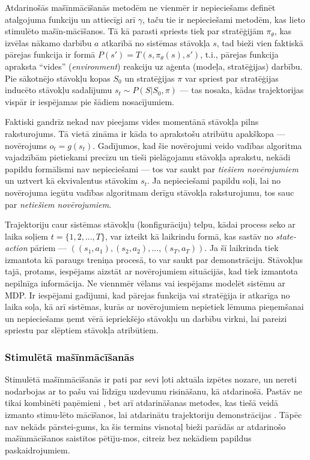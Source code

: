\documentclass[12pt, a4paper]{article}
\numberwithin{equation}{section} %
\begin{document}
Atdarinošās mašīnmācīšanās metodēm ne vienmēr ir nepieciešams definēt atalgojuma funkciju un attiecīgi arī $\gamma$, taču tie ir nepieciešami metodēm, kas lieto stimulēto mašīn-mācīšanos. Tā kā parasti spriests tiek par stratēģijām $\pi_{\theta}$, kas izvēlas nākamo darbību $a$ atkarībā no sistēmas stāvokļa $s$, tad bieži vien faktiskā pārejas funkcija ir formā $P(s') = T(s, \pi_{\theta}(s), s')$, t.i., pārejas funkcija apraksta ``vides'' (\textit{environment}) reakciju uz aģenta (modeļa, stratēģijas) darbību. Pie sākotnējo stāvokļu kopas $S_0$ un stratēģijas $\pi$ var spriest par stratēģijas inducēto stāvokļu sadalījumu $s_t \sim P(S \vert S_0, \pi)$ --- tas nosaka, kādas trajektorijas vispār ir iespējamas pie šādiem nosacījumiem. 

Faktiski gandrīz nekad nav pieejams vides momentānā stāvokļa pilns raksturojums. Tā vietā zināma ir kāda to aprakstošu atribūtu apakškopa --- novērojums $o_t = g(s_t)$. Gadījumos, kad šie novērojumi veido vadības algoritma vajadzībām pietiekami precīzu un tieši pielāgojamu stāvokļa aprakstu, nekādi papildu formālismi nav nepieciešami --- tos var saukt par \textit{tiešiem novērojumiem} un uztvert kā ekvivalentus stāvokim $s_t$. Ja nepieciešami papildu soļi, lai no novērojuma iegūtu vadības algoritmam derīgu stāvokļa raksturojumu, tos sauc par \textit{netiešiem novērojumiem}.

Trajektoriju caur sistēmas stāvokļu (konfigurāciju) telpu, kādai process seko ar laika soļiem $t = \lbrace 1, 2, ..., T \rbrace$, var izteikt kā laikrindu formā, kas sastāv no \textit{state-action} pāriem --- $((s_1, a_1), (s_2, a_2), ..., (s_T, a_T))$. Ja šī laikrinda tiek izmantota kā paraugs treniņa procesā, to var saukt par demonstrāciju. Stāvokļus tajā, protams, iespējams aizstāt ar novērojumiem situācijās, kad tiek izmantota nepilnīga informācija. Ne viennmēr vēlams vai iespējams modelēt sistēmu ar MDP. Ir iespējami gadījumi, kad pārejas funkcija vai stratēģija ir atkarīga no laika soļa, kā arī sistēmas, kurās ar novērojumiem nepietiek lēmuma pieņemšanai un nepieciešams ņemt vērā iepriekšējo stāvokļu un darbību virkni, lai pareizi spriestu par slēptiem stāvokļa atribūtiem. 

\subsubsection{Stimulētā mašīnmācīšanās}

Stimulētā mašīnmācīšanās ir pati par sevi ļoti aktuāla izpētes nozare, un nereti nodarbojas ar to pašu vai līdzīgu uzdevumu risināšanu, kā atdarinošā. Pastāv ne tikai kombinēti paņēmieni \cite{gupta2019relay, brown2019extrapolating}, bet arī atdarināšanas metodes, kas tiešā veidā izmanto stimu-lēto mācīšanos, lai atdarinātu trajektoriju demonstrācijas \cite{englert2018learning}. Tāpēc nav nekāds pārstei-gums, ka šis termins visnotaļ bieži parādās ar atdarinošo mašīnmācīšanos saistītos pētīju-mos, citreiz bez nekādiem papildus paskaidrojumiem.
\end{document}
